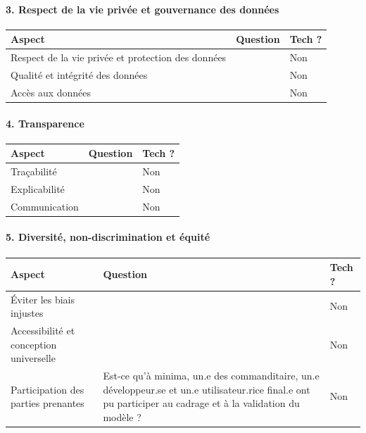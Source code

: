 \documentclass[10pt, french, a4paper]{article}
\begin{document}
\paragraph{3. Respect de la vie privée et gouvernance des données}

\begin{center}
  \begin{tabular}{ |p{4cm}|p{6cm}|p{2cm}| } 
    \hline
    Aspect & Question & Tech ? \\
    \hline
    \hline
    Respect de la vie privée et protection des données &  & Non \\
    \hline
    Qualité et intégrité des données &  & Non \\
    \hline
    Accès aux données &  & Non \\
    \hline
    
  \end{tabular}
\end{center}

\paragraph{4. Transparence}

\begin{center}
  \begin{tabular}{ |p{4cm}|p{6cm}|p{2cm}| } 
    \hline
    Aspect & Question & Tech ? \\
    \hline
    \hline
    Traçabilité &  & Non \\
    \hline
    Explicabilité &  & Non \\
    \hline
    Communication &  & Non \\
    \hline
    
  \end{tabular}
\end{center}

\paragraph{5. Diversité, non-discrimination et équité}

\begin{center}
  \begin{tabular}{ |p{4cm}|p{6cm}|p{2cm}| } 
    \hline
    Aspect & Question & Tech ? \\
    \hline
    \hline
    Éviter les biais injustes &  & Non \\
    \hline
    Accessibilité et conception universelle &  & Non \\
    \hline
    Participation des parties prenantes & Est-ce qu'à minima, un.e des commanditaire, un.e développeur.se et un.e utilisateur.rice final.e ont pu participer au cadrage et à la validation du modèle ? & Non \\
    \hline
    
  \end{tabular}
\end{center}
\end{document}
